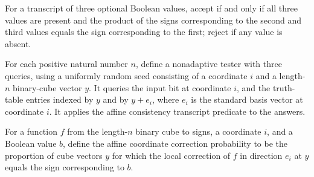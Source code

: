 \begin{definition}
\label{FABL.affineConsistencyTranscriptAccept}
\leanok
{}
For a transcript of three optional Boolean values, accept if and only if all three
values are present and the product of the signs corresponding to the second and third
values equals the sign corresponding to the first; reject if any value is absent.
\end{definition}

\begin{definition}
\label{FABL.affineConsistencyFunctionTester}
\leanok
{}
For each positive natural number $n$, define a nonadaptive tester with three queries,
using a uniformly random seed consisting of a coordinate $i$ and a length-$n$
binary-cube vector $y$. It queries the input bit at coordinate $i$, and the truth-table
entries indexed by $y$ and by $y+e_i$, where $e_i$ is the standard basis vector at
coordinate $i$. It applies the affine consistency transcript predicate to the answers.
\end{definition}

\begin{definition}
\label{FABL.affineCoordinateCorrectionProbability}
\leanok
{}
For a function $f$ from the length-$n$ binary cube to signs, a coordinate $i$, and a
Boolean value $b$, define the affine coordinate correction probability to be the
proportion of cube vectors $y$ for which the local correction of $f$ in direction $e_i$
at $y$ equals the sign corresponding to $b$.
\end{definition}

